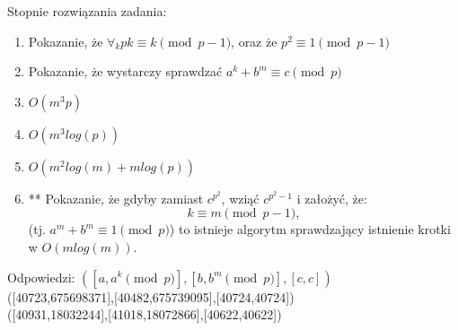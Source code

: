 \documentclass{article}
\theoremstyle{break}
\begin{document}
Stopnie rozwiązania zadania:
\begin{enumerate}
\item Pokazanie, że $\forall_{k} pk \equiv k \pmod{p-1}$, oraz że $p^2 \equiv 1 \pmod{p-1}$
\item Pokazanie, że wystarczy sprawdzać $a^k + b^m \equiv c \pmod{p}$
\item $O(m^3 p)$
\item $O(m^3 log(p))$%
\item $O(m^2 log(m) + m log(p))$ %
\item ** Pokazanie, że gdyby zamiast $c^{p^2}$, wziąć $c^{p^2 - 1}$ i założyć, że:
\begin{displaymath}
k \equiv m \pmod{p-1},
\end{displaymath} (tj. $a^m + b^m \equiv 1 \pmod{p}$) to istnieje algorytm sprawdzający istnienie krotki w $O(mlog(m))$.
\end{enumerate}
Odpowiedzi: $([a,a^k \pmod{p}],[b,b^m \pmod{p}],[c,c])$ \\
([40723,675698371],[40482,675739095],[40724,40724]) \\
([40931,18032244],[41018,18072866],[40622,40622]) \\
\end{document}
